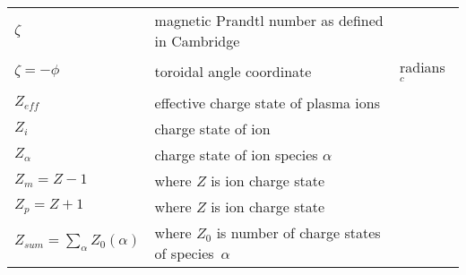 \begin{longtable}{|p{3.0cm}|p{10.0cm}|p{3.0cm}|}
$\zeta$ & magnetic Prandtl number as defined in Cambridge & \\
$\zeta=-\phi$ & toroidal angle coordinate & radians $^c$ \\
$Z_{eff}$ & effective charge state of plasma ions & \\
$Z_i$ & charge state of ion & \\
$Z_\alpha$ & charge state of ion species $\alpha$ & \\
$Z_m=Z-1$ & where $Z$ is ion charge state & \\
$Z_p=Z+1$ & where $Z$ is ion charge state & \\
$Z_{sum}=\sum_\alpha Z_0(\alpha)$ & where $Z_0$ is number of charge states of species~$\alpha$ & \\
\hline
\end{longtable}
